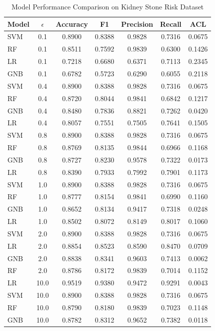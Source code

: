 \begin{table}[h]
\centering
\caption{Model Performance Comparison on Kidney Stone Risk Dataset}
\label{tab:kidney_stone_comparison}
\begin{tabular}{lcccccc}
\hline
Model & $\epsilon$ & Accuracy & F1 & Precision & Recall & ACL \\
\hline
SVM & 0.1 & 0.8900 & 0.8388 & 0.9828 & 0.7316 & 0.0675 \\
RF & 0.1 & 0.8511 & 0.7592 & 0.9839 & 0.6300 & 0.1426 \\
LR & 0.1 & 0.7218 & 0.6680 & 0.6371 & 0.7113 & 0.2345 \\
GNB & 0.1 & 0.6782 & 0.5723 & 0.6290 & 0.6055 & 0.2118 \\
\hline
SVM & 0.4 & 0.8900 & 0.8388 & 0.9828 & 0.7316 & 0.0675 \\
RF & 0.4 & 0.8720 & 0.8044 & 0.9841 & 0.6842 & 0.1217 \\
GNB & 0.4 & 0.8480 & 0.7836 & 0.8821 & 0.7262 & 0.0420 \\
LR & 0.4 & 0.8057 & 0.7551 & 0.7505 & 0.7641 & 0.1505 \\
\hline
SVM & 0.8 & 0.8900 & 0.8388 & 0.9828 & 0.7316 & 0.0675 \\
RF & 0.8 & 0.8769 & 0.8135 & 0.9844 & 0.6966 & 0.1168 \\
GNB & 0.8 & 0.8727 & 0.8230 & 0.9578 & 0.7322 & 0.0173 \\
LR & 0.8 & 0.8390 & 0.7933 & 0.7992 & 0.7901 & 0.1173 \\
\hline
SVM & 1.0 & 0.8900 & 0.8388 & 0.9828 & 0.7316 & 0.0675 \\
RF & 1.0 & 0.8777 & 0.8154 & 0.9841 & 0.6990 & 0.1160 \\
GNB & 1.0 & 0.8652 & 0.8134 & 0.9417 & 0.7318 & 0.0248 \\
LR & 1.0 & 0.8502 & 0.8072 & 0.8149 & 0.8017 & 0.1060 \\
\hline
SVM & 2.0 & 0.8900 & 0.8388 & 0.9828 & 0.7316 & 0.0675 \\
LR & 2.0 & 0.8854 & 0.8523 & 0.8590 & 0.8470 & 0.0709 \\
GNB & 2.0 & 0.8838 & 0.8341 & 0.9603 & 0.7413 & 0.0062 \\
RF & 2.0 & 0.8786 & 0.8172 & 0.9839 & 0.7014 & 0.1152 \\
\hline
LR & 10.0 & 0.9519 & 0.9380 & 0.9472 & 0.9291 & 0.0043 \\
SVM & 10.0 & 0.8900 & 0.8388 & 0.9828 & 0.7316 & 0.0675 \\
RF & 10.0 & 0.8790 & 0.8180 & 0.9839 & 0.7023 & 0.1148 \\
GNB & 10.0 & 0.8782 & 0.8312 & 0.9652 & 0.7382 & 0.0118 \\
\hline
\end{tabular}
\end{table}